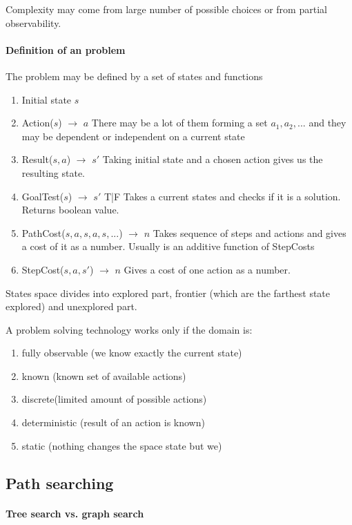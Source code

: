 \documentclass[a4paper,10pt]{article}
\begin{document}
Complexity may come from large number of possible choices or from partial observability.

\paragraph{Definition of an problem}
The problem may be defined by a set of states and functions
\begin{enumerate}
  \item Initial state $s$
  \item Action($s$) $\rightarrow$ $a$ There may be a lot of them forming a set ${a_1, a_2, ...}$ and they may be dependent or independent on a current state
  \item Result($s,a$) $\rightarrow$ $s'$ Taking initial state and a chosen action gives us the resulting state.
  \item GoalTest($s$) $\rightarrow$ $s'$ T|F Takes a current states and checks if it is a solution. Returns boolean value.
  \item PathCost($s,a,s,a,s,...$) $\rightarrow$ $n$ Takes sequence of steps and actions and gives a cost of it as a number. Usually is an additive function of StepCosts
  \item StepCost($s,a,s'$) $\rightarrow$ $n$ Gives a cost of one action as a number.
\end{enumerate}

States space divides into explored part, frontier (which are the farthest state explored) and unexplored part.

A problem solving technology works only if the domain is:
\begin{enumerate}
 \item fully observable (we know exactly the current state)
 \item known (known set of available actions)
 \item discrete(limited amount of possible actions)
 \item deterministic (result of an action is known)
 \item static (nothing changes the space state but we)
\end{enumerate}

\subsection{Path searching}

\paragraph{Tree search vs. graph search} 
\end{document}
